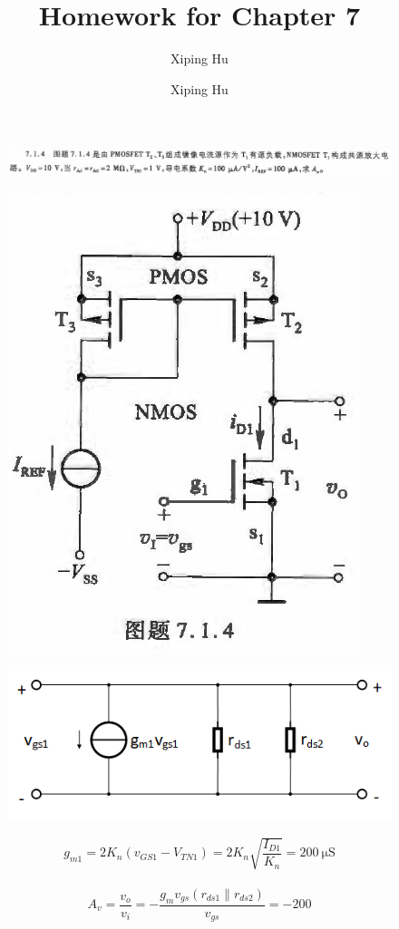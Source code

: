 \documentclass{article}
\author{Xiping Hu}
\author{Xiping Hu}
\affil{https://hxp.plus/}
\title{Homework for Chapter 7}
\begin{document}
\maketitle

\begin{figure}[H]
  \centering
  \includegraphics[width=\linewidth]{figures/Problem714} 
  \label{fig:}
\end{figure}

\begin{figure}[H]
  \centering
  \includegraphics[width=0.4\linewidth]{figures/Problem7141} 
  \label{fig:}
\end{figure}

\begin{figure}[H]
  \centering
  \includegraphics[width=0.8\linewidth]{figures/Problem7142} 
  \label{fig:}
\end{figure}

\begin{equation*}
  \begin{aligned}
    g_{m1} = 2 K_n \left( v_{GS1} - V_{TN1} \right) = 2 K_n \sqrt{\dfrac{I_{D1}}{K_n} } = 200 \  \mathrm{\mu S}
  \end{aligned}
\end{equation*}

\begin{equation*}
  \begin{aligned}
    A_v = \dfrac{v_o}{v_i} = - \dfrac{g_m v_{gs} \left( r_{ds1} \parallel r_{ds2} \right)}{v_{gs}} = - 200 
  \end{aligned}
\end{equation*}
\end{document}
